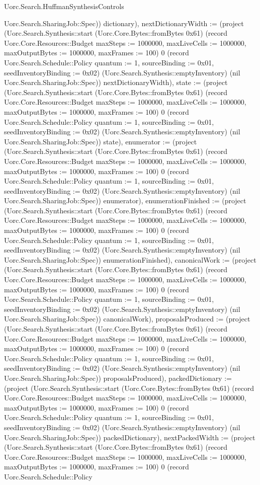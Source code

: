 \begin{lexlean}{Uorc.Search.HuffmanSynthesisControls}
\begin{semanticmodule}
{Uorc.Search.SharingJob::Spec)) dictionary), nextDictionaryWidth := (project (Uorc.Search.Synthesis::start (Uorc.Core.Bytes::fromBytes 0x61) (record Uorc.Core.Resources::Budget {maxSteps := 1000000, maxLiveCells := 1000000, maxOutputBytes := 1000000, maxFrames := 100}) 0 (record Uorc.Search.Schedule::Policy {quantum := 1, sourceBinding := 0x01, seedInventoryBinding := 0x02}) (Uorc.Search.Synthesis::emptyInventory) (nil Uorc.Search.SharingJob::Spec)) nextDictionaryWidth), state := (project (Uorc.Search.Synthesis::start (Uorc.Core.Bytes::fromBytes 0x61) (record Uorc.Core.Resources::Budget {maxSteps := 1000000, maxLiveCells := 1000000, maxOutputBytes := 1000000, maxFrames := 100}) 0 (record Uorc.Search.Schedule::Policy {quantum := 1, sourceBinding := 0x01, seedInventoryBinding := 0x02}) (Uorc.Search.Synthesis::emptyInventory) (nil Uorc.Search.SharingJob::Spec)) state), enumerator := (project (Uorc.Search.Synthesis::start (Uorc.Core.Bytes::fromBytes 0x61) (record Uorc.Core.Resources::Budget {maxSteps := 1000000, maxLiveCells := 1000000, maxOutputBytes := 1000000, maxFrames := 100}) 0 (record Uorc.Search.Schedule::Policy {quantum := 1, sourceBinding := 0x01, seedInventoryBinding := 0x02}) (Uorc.Search.Synthesis::emptyInventory) (nil Uorc.Search.SharingJob::Spec)) enumerator), enumerationFinished := (project (Uorc.Search.Synthesis::start (Uorc.Core.Bytes::fromBytes 0x61) (record Uorc.Core.Resources::Budget {maxSteps := 1000000, maxLiveCells := 1000000, maxOutputBytes := 1000000, maxFrames := 100}) 0 (record Uorc.Search.Schedule::Policy {quantum := 1, sourceBinding := 0x01, seedInventoryBinding := 0x02}) (Uorc.Search.Synthesis::emptyInventory) (nil Uorc.Search.SharingJob::Spec)) enumerationFinished), canonicalWork := (project (Uorc.Search.Synthesis::start (Uorc.Core.Bytes::fromBytes 0x61) (record Uorc.Core.Resources::Budget {maxSteps := 1000000, maxLiveCells := 1000000, maxOutputBytes := 1000000, maxFrames := 100}) 0 (record Uorc.Search.Schedule::Policy {quantum := 1, sourceBinding := 0x01, seedInventoryBinding := 0x02}) (Uorc.Search.Synthesis::emptyInventory) (nil Uorc.Search.SharingJob::Spec)) canonicalWork), proposalsProduced := (project (Uorc.Search.Synthesis::start (Uorc.Core.Bytes::fromBytes 0x61) (record Uorc.Core.Resources::Budget {maxSteps := 1000000, maxLiveCells := 1000000, maxOutputBytes := 1000000, maxFrames := 100}) 0 (record Uorc.Search.Schedule::Policy {quantum := 1, sourceBinding := 0x01, seedInventoryBinding := 0x02}) (Uorc.Search.Synthesis::emptyInventory) (nil Uorc.Search.SharingJob::Spec)) proposalsProduced), packedDictionary := (project (Uorc.Search.Synthesis::start (Uorc.Core.Bytes::fromBytes 0x61) (record Uorc.Core.Resources::Budget {maxSteps := 1000000, maxLiveCells := 1000000, maxOutputBytes := 1000000, maxFrames := 100}) 0 (record Uorc.Search.Schedule::Policy {quantum := 1, sourceBinding := 0x01, seedInventoryBinding := 0x02}) (Uorc.Search.Synthesis::emptyInventory) (nil Uorc.Search.SharingJob::Spec)) packedDictionary), nextPackedWidth := (project (Uorc.Search.Synthesis::start (Uorc.Core.Bytes::fromBytes 0x61) (record Uorc.Core.Resources::Budget {maxSteps := 1000000, maxLiveCells := 1000000, maxOutputBytes := 1000000, maxFrames := 100}) 0 (record Uorc.Search.Schedule::Policy }
\end{semanticmodule}
\end{lexlean}
